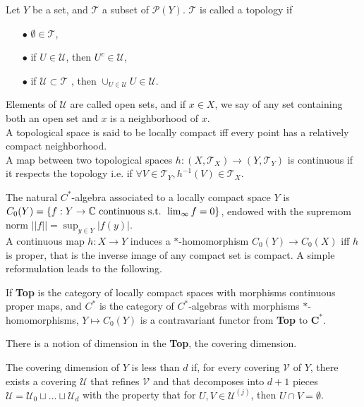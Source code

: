 \begin{definition}
Let $Y$ be a set, and $\mathcal T$ a subset of $\mathcal P(Y)$. $\mathcal T$ is called a topology if 
\begin{itemize}
\item[$\bullet$] $\emptyset \in \mathcal T$,
\item[$\bullet$] if $U\in\mathcal U$, then $U^c\in \mathcal U$,
\item[$\bullet$] if $\mathcal U\subset\mathcal T$ , then $\cup_{U\in \mathcal U} U \in \mathcal U$.
\end{itemize}
Elements of $\mathcal U$ are called open sets, and if $x\in X$, we  say of any set containing both an open set and $x$ is a neighborhood of $x$.\\
A topological space is said to be locally compact iff every point has a relatively compact neighborhood. \\
A map between two topological spaces $h : (X,\mathcal T_X)\rightarrow (Y,\mathcal T_Y)$ is continuous if it respects the topology i.e. if $\forall V\in \mathcal T_Y, h^{-1}(V)\in \mathcal T_X$.\\
\end{definition}

The natural $C^*$-algebra associated to a locally compact space $Y$ is $C_0(Y)=\{ f :Y \rightarrow \mathbb C \text{ continuous s.t. }\lim_{\infty}f=0\}$, endowed with the supremom norm $||f||=\sup_{y\in Y} |f(y)|$.\\

A continuous map $h : X\rightarrow Y $ induces a $*$-homomorphism $C_0(Y)\rightarrow C_0(X)$ iff $h$ is proper, that is the inverse image of any compact set is compact. A simple reformulation leads to the following.

\begin{prop}
If \textbf{Top} is the category of locally compact spaces with morphisms continuous proper maps, and $C^*$ is the category of $C^*$-algebras with morphisms $*$-homomorphisms, $Y\mapsto C_0(Y)$ is a contravariant functor from \textbf{Top} to $\textbf{C}^*$. 
\end{prop}

There is a notion of dimension in the \textbf{Top}, the covering dimension.

\begin{definition}
The covering dimension of $Y$ is less than $d$ if, for every covering $\mathcal V$ of $Y$, there exists a covering $\mathcal U$ that refines $\mathcal V$ and that decomposes into $d+1$ pieces $\mathcal U = \mathcal U_0 \sqcup ... \sqcup \mathcal U_d$ with the property that for $U,V\in \mathcal U^{(j)}$, then $U\cap V=\emptyset$.
\end{definition}


